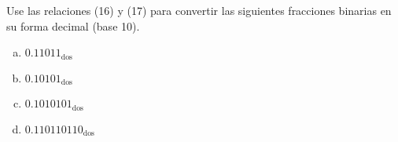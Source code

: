 \begin{enunciado}
 Use las relaciones (16) y (17) para convertir las siguientes fracciones binarias en su forma decimal (base 10).
 \begin{multicols}{2}
  \begin{enumerate}[(a)]
   \item $0.11011_{\text{dos}}$
   \item $0.10101_{\text{dos}}$
  \end{enumerate}
 \end{multicols}
 \begin{multicols}{2}
  \begin{enumerate}[(a)]
   \setcounter{enumii}{2}
   \item $0.1010101_{\text{dos}}$
   \item $0.110110110_{\text{dos}}$
  \end{enumerate}
 \end{multicols}
\end{enunciado}

